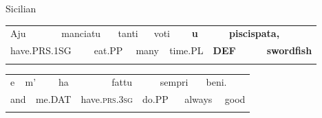 \begin{listWWNumileveli}
\item {}

\end{listWWNumileveli}

\begin{listWWNumlviileveli}
\item {}

\begin{styleExLtrTbl}
Sicilian

\end{styleExLtrTbl}

\end{listWWNumlviileveli}

\begin{tabular}{llllllllllll}
\lsptoprule
Aju & \multicolumn{2}{l}{manciatu

} & \multicolumn{2}{l}{tanti

} & \multicolumn{2}{l}{voti

} & \multicolumn{2}{l}{{\bfseries u}

} & \multicolumn{2}{l}{{\bfseries piscispata,}

} & \\
\multicolumn{2}{l}{have.PRS.1SG

} & \multicolumn{2}{l}{eat.PP

} & \multicolumn{2}{l}{many

} & \multicolumn{2}{l}{time.PL

} & \multicolumn{2}{l}{{\bfseries DEF}

} & \multicolumn{2}{l}{{\bfseries swordfish}

}\\
\lspbottomrule
\end{tabular}

\begin{tabular}{llllllllllll}
\lsptoprule
e & \multicolumn{2}{l}{m’

} & \multicolumn{2}{l}{ha

} & \multicolumn{2}{l}{fattu

} & \multicolumn{2}{l}{sempri

} & \multicolumn{2}{l}{beni.

} & \\
\multicolumn{2}{l}{and

} & \multicolumn{2}{l}{me.DAT

} & \multicolumn{2}{l}{have.\textsc{prs.3sg}

} & \multicolumn{2}{l}{do.PP

} & \multicolumn{2}{l}{always

} & \multicolumn{2}{l}{good

}\\
\lspbottomrule
\end{tabular}

